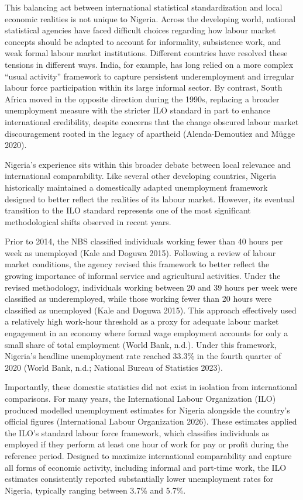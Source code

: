 \documentclass[
  letterpaper,
  DIV=11,
  numbers=noendperiod]{scrartcl}
\begin{document}
This balancing act between international statistical standardization and
local economic realities is not unique to Nigeria. Across the developing
world, national statistical agencies have faced difficult choices
regarding how labour market concepts should be adapted to account for
informality, subsistence work, and weak formal labour market
institutions. Different countries have resolved these tensions in
different ways. India, for example, has long relied on a more complex
``usual activity'' framework to capture persistent underemployment and
irregular labour force participation within its large informal sector.
By contrast, South Africa moved in the opposite direction during the
1990s, replacing a broader unemployment measure with the stricter ILO
standard in part to enhance international credibility, despite concerns
that the change obscured labour market discouragement rooted in the
legacy of apartheid (Alenda-Demoutiez and Mügge 2020).

Nigeria's experience sits within this broader debate between local
relevance and international comparability. Like several other developing
countries, Nigeria historically maintained a domestically adapted
unemployment framework designed to better reflect the realities of its
labour market. However, its eventual transition to the ILO standard
represents one of the most significant methodological shifts observed in
recent years.

Prior to 2014, the NBS classified individuals working fewer than 40
hours per week as unemployed (Kale and Doguwa 2015). Following a review
of labour market conditions, the agency revised this framework to better
reflect the growing importance of informal service and agricultural
activities. Under the revised methodology, individuals working between
20 and 39 hours per week were classified as underemployed, while those
working fewer than 20 hours were classified as unemployed (Kale and
Doguwa 2015). This approach effectively used a relatively high work-hour
threshold as a proxy for adequate labour market engagement in an economy
where formal wage employment accounts for only a small share of total
employment (World Bank, n.d.). Under this framework, Nigeria's headline
unemployment rate reached 33.3\% in the fourth quarter of 2020 (World
Bank, n.d.; National Bureau of Statistics 2023).

Importantly, these domestic statistics did not exist in isolation from
international comparisons. For many years, the International Labour
Organization (ILO) produced modelled unemployment estimates for Nigeria
alongside the country's official figures (International Labour
Organization 2026). These estimates applied the ILO's standard labour
force framework, which classifies individuals as employed if they
perform at least one hour of work for pay or profit during the reference
period. Designed to maximize international comparability and capture all
forms of economic activity, including informal and part-time work, the
ILO estimates consistently reported substantially lower unemployment
rates for Nigeria, typically ranging between 3.7\% and 5.7\%.
\end{document}
